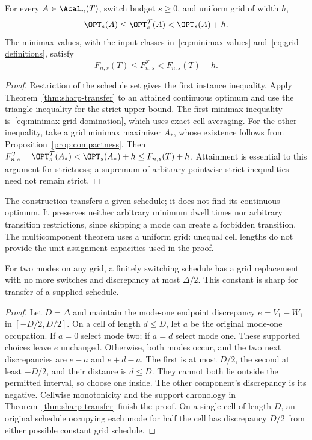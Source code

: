 \begin{corollary}\label{cor:opt-transfer}
For every $A\in\Acal_n(T)$, switch budget $s\ge0$, and uniform grid of
width $h$,
\begin{equation}\label{eq:instance-transfer}
 \OPT_s(A)\le\OPT_s^{\mathcal T}(A)<\OPT_s(A)+h.
\end{equation}
The minimax values, with the input classes in~\eqref{eq:minimax-values}
and~\eqref{eq:grid-definitions}, satisfy
\begin{equation}\label{eq:minimax-transfer}
 F_{n,s}(T)\le F_{n,s}^{\mathcal T}<F_{n,s}(T)+h.
\end{equation}
\end{corollary}
\begin{proof}
Restriction of the schedule set gives the first instance inequality. Apply
Theorem~\ref{thm:sharp-transfer} to an attained continuous optimum and use
the triangle inequality for the strict upper bound. The first minimax
inequality is~\eqref{eq:minimax-grid-domination}, which uses exact cell
averaging. For the other inequality, take a grid minimax maximizer $A_*$,
whose existence follows from Proposition~\ref{prop:compactness}. Then
$F_{n,s}^{\mathcal T}=\OPT_s^{\mathcal T}(A_*)<\OPT_s(A_*)+h
\le F_{n,s}(T)+h$. Attainment is essential to this argument for strictness;
a supremum of arbitrary pointwise strict inequalities need not remain strict.
\end{proof}

The construction transfers a given schedule; it does not find its continuous
optimum. It preserves neither arbitrary minimum dwell times nor arbitrary
transition restrictions, since skipping a mode can create a forbidden
transition. The multicomponent theorem uses a uniform grid: unequal cell
lengths do not provide the unit assignment capacities used in the proof.

\begin{proposition}\label{prop:binary-transfer}
For two modes on any grid, a finitely switching schedule has a grid
replacement with no more switches and discrepancy at most
$\bar\Delta/2$. This constant is sharp for transfer of a supplied schedule.
\end{proposition}
\begin{proof}
Let $D=\bar\Delta$ and maintain the mode-one endpoint discrepancy
$e=V_1-W_1$ in $[-D/2,D/2]$. On a cell of length $d\le D$, let $a$ be
the original mode-one occupation. If $a=0$ select mode two; if $a=d$
select mode one. These supported choices leave $e$ unchanged. Otherwise,
both modes occur, and the two next discrepancies are $e-a$ and $e+d-a$.
The first is at most $D/2$, the second at least $-D/2$, and their distance
is $d\le D$. They cannot both lie outside the permitted interval, so choose
one inside. The other component's discrepancy is its negative. Cellwise
monotonicity and the support chronology in
Theorem~\ref{thm:sharp-transfer} finish the proof. On a single cell of length
$D$, an original schedule occupying each mode for half the cell has
discrepancy $D/2$ from either possible constant grid schedule.
\end{proof}

